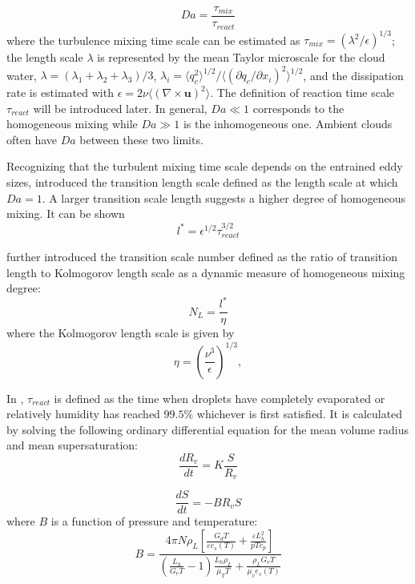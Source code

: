 \documentclass[draft,jgrga]{AGUTeX}
\begin{document}
\begin{article}
\begin{equation}
Da=\frac{\tau_{mix}}{\tau_{react}}\label{eq:DaNumber}
\end{equation}
where the turbulence mixing time scale can be estimated as $\tau_{mix} = (\lambda^2/\epsilon)^{1/3}$; the length scale $\lambda$ is represented by the mean Taylor microscale for the cloud water, $\lambda = 
(\lambda_1+\lambda_2+\lambda_3)/3$, $\lambda_i = \langle q_c^2\rangle^{1/2}/\langle(\partial q_c/\partial x_i)^2\rangle^{1/2}$, and the dissipation rate is estimated with $\epsilon = 2\nu\langle(\nabla\times \mathbf{u})^2\rangle$. The definition of reaction time scale $\tau_{react}$ will be introduced later. In general, $Da\ll1$ corresponds to the homogeneous mixing while $Da\gg1$ is
the inhomogeneous one. Ambient clouds often have $Da$ between these two limits.

Recognizing that the turbulent mixing time scale depends on the entrained eddy sizes, 
\cite{Lehmann2009} introduced the transition length scale defined as the length scale at 
which $Da = 1$. A larger transition scale length suggests a higher degree of homogeneous mixing. 
It can be shown
\[
l^{*}=\epsilon^{1/2}\tau_{react}^{3/2}
\]

\cite{Lu2011} further introduced the transition scale number defined as the ratio of 
transition length to Kolmogorov length scale as a dynamic measure of homogeneous mixing degree:
\begin{equation}
N_{L}=\frac{l^{*}}{\eta}\label{eq:NL}
\end{equation}
where the Kolmogorov length scale is given by
\[
\eta = (\frac{\nu^3}{\epsilon})^{1/3}, 
\]


In \cite{Lehmann2009, Lu2013}, $\tau_{react}$ is defined as the time when droplets have completely 
evaporated or relatively humidity has reached $99.5\%$ whichever is first satisfied. It is calculated 
by solving the following ordinary differential equation for the mean volume radius and mean supersaturation:
\begin{equation}
\frac{dR_{v}}{dt}=K\frac{S}{R_{v}}\label{eq:DiffR}
\end{equation}

\begin{equation}
\frac{dS}{dt}=-BR_{v}S\label{eq:DiffSuper}
\end{equation}
where $B$ is a function of pressure and temperature:
\begin{equation}
B = 
\frac{4\pi N\rho_L[\frac{G_dT}{\varepsilon e_s(T)} + \frac{\varepsilon L^2_h}{pTc_p}]} 
{(\frac{L_h}{G_vT}-1)\frac{L_h\rho_L}{\mu_T T} + \frac{\rho_L G_v T}{\mu_v e_s(T)}}
\end{equation}


\end{article}
\end{document}
